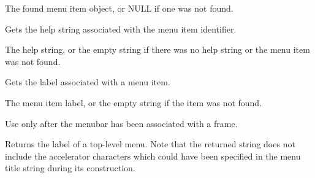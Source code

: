



The found menu item object, or NULL if one was not found.

\label{wxmenubargethelpstring}


Gets the help string associated with the menu item identifier.




The help string, or the empty string if there was no help string or the menu item
was not found.



\label{wxmenubargetlabel}


Gets the label associated with a menu item.




The menu item label, or the empty string if the item was not found.


Use only after the menubar has been associated with a frame.

\label{wxmenubargetlabeltop}


Returns the label of a top-level menu. Note that the returned string does not
include the accelerator characters which could have been specified in the menu
title string during its construction.



